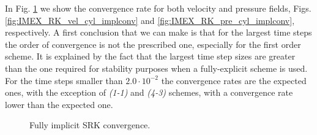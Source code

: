 In Fig. \ref{fig:IMEX_RK_cyl_conv} we show the convergence rate for both velocity and pressure fields, Figs. \ref{fig:IMEX_RK_vel_cyl_implconv} and  \ref{fig:IMEX_RK_pre_cyl_implconv}, respectively. A first conclusion that we can make is that for the largest time steps the order of convergence is not the prescribed one, especially for the first order scheme. It is explained by the fact that the largest time step sizes are greater than the one required for stability purposes when a fully-explicit scheme is used. %
 For the time steps smaller than $2.0\cdot10^{-2}$ the convergence rates are the expected ones, with the exception of \textit{(1-1)} and \textit{(4-3)} schemes, with a convergence rate lower than the expected one.
\begin{figure}[h!]
  \centering
  \caption{Fully implicit SRK convergence.}
  \label{fig:IMEX_RK_cyl_conv}
\end{figure}
